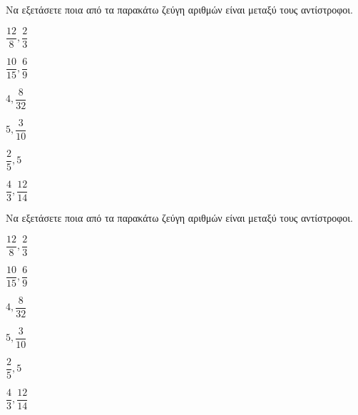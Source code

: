 Να εξετάσετε ποια από τα παρακάτω ζεύγη αριθμών είναι μεταξύ τους αντίστροφοι.
\begin{multicols}{3}
\begin{alist}
\item $ \dfrac{12}{8},\dfrac{2}{3} $
\item $ \dfrac{10}{15},\dfrac{6}{9} $
\item $ 4,\dfrac{8}{32} $
\item $ 5,\dfrac{3}{10} $
\item $ \dfrac{2}{5},5 $
\item $ \dfrac{4}{3},\dfrac{12}{14} $
\end{alist}
\end{multicols}
Να εξετάσετε ποια από τα παρακάτω ζεύγη αριθμών είναι μεταξύ τους αντίστροφοι.
\begin{multicols}{3}
\begin{alist}
\item $ \dfrac{12}{8},\dfrac{2}{3} $
\item $ \dfrac{10}{15},\dfrac{6}{9} $
\item $ 4,\dfrac{8}{32} $
\item $ 5,\dfrac{3}{10} $
\item $ \dfrac{2}{5},5 $
\item $ \dfrac{4}{3},\dfrac{12}{14} $
\end{alist}
\end{multicols}
